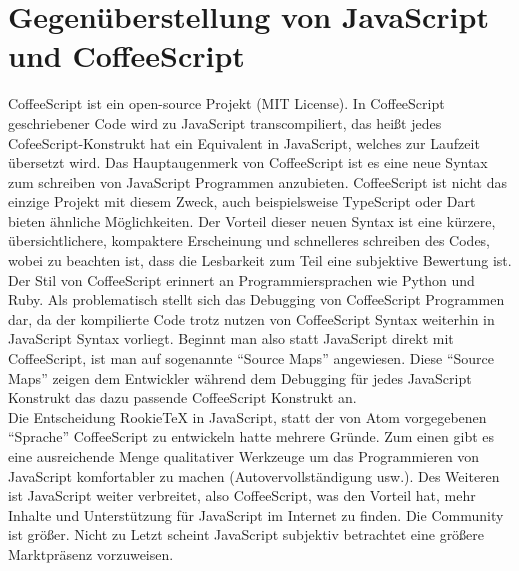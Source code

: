     \section{Gegenüberstellung von JavaScript und CoffeeScript}
        CoffeeScript ist ein open-source Projekt (MIT License). In CoffeeScript geschriebener Code wird zu JavaScript transcompiliert, das heißt jedes CofeeScript-Konstrukt hat ein Equivalent in JavaScript, welches zur Laufzeit übersetzt wird. Das Hauptaugenmerk von CoffeeScript ist es eine neue Syntax zum schreiben von JavaScript Programmen anzubieten. CoffeeScript ist nicht das einzige Projekt mit diesem Zweck, auch beispielsweise TypeScript oder Dart bieten ähnliche Möglichkeiten. Der Vorteil dieser neuen Syntax ist eine kürzere, übersichtlichere, kompaktere Erscheinung und schnelleres schreiben des Codes, wobei zu beachten ist, dass die Lesbarkeit zum Teil eine subjektive Bewertung ist. Der Stil von CoffeeScript erinnert an Programmiersprachen wie Python und Ruby. Als problematisch stellt sich das Debugging von CoffeeScript Programmen dar, da der kompilierte Code trotz nutzen von CoffeeScript Syntax weiterhin in JavaScript Syntax vorliegt. Beginnt man also statt JavaScript direkt mit CoffeeScript, ist man auf sogenannte "`Source Maps"' angewiesen. Diese "`Source Maps"' zeigen dem Entwickler während dem Debugging für jedes JavaScript Konstrukt das dazu passende CoffeeScript Konstrukt an.
        \\
        Die Entscheidung RookieTeX in JavaScript, statt der von Atom vorgegebenen "`Sprache"' CoffeeScript zu entwickeln hatte mehrere Gründe. Zum einen gibt es eine ausreichende Menge qualitativer Werkzeuge um das Programmieren von JavaScript komfortabler zu machen (Autovervollständigung usw.). Des Weiteren ist JavaScript weiter verbreitet, also CoffeeScript, was den Vorteil hat, mehr Inhalte und Unterstützung für JavaScript im Internet zu finden. Die Community ist größer. Nicht zu Letzt scheint JavaScript subjektiv betrachtet eine größere Marktpräsenz vorzuweisen.

